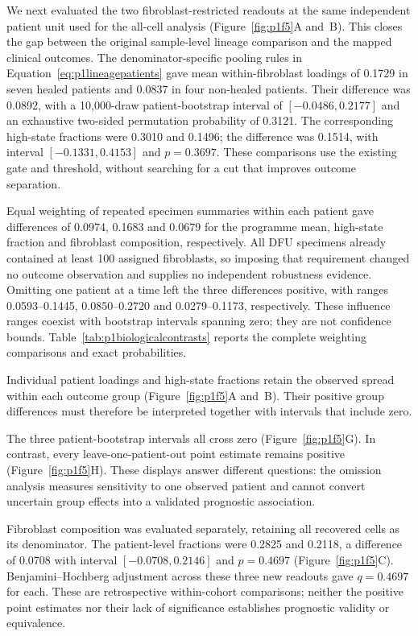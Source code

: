 

We next evaluated the two fibroblast-restricted readouts at the same independent patient unit used for the all-cell analysis (Figure~\ref{fig:p1f5}A and~B). This closes the gap between the original sample-level lineage comparison and the mapped clinical outcomes. The denominator-specific pooling rules in Equation~\eqref{eq:p1lineagepatients} gave mean within-fibroblast loadings of 0.1729 in seven healed patients and 0.0837 in four non-healed patients. Their difference was 0.0892, with a 10,000-draw patient-bootstrap interval of $[-0.0486,0.2177]$ and an exhaustive two-sided permutation probability of 0.3121. The corresponding high-state fractions were 0.3010 and 0.1496; the difference was 0.1514, with interval $[-0.1331,0.4153]$ and $p=0.3697$. These comparisons use the existing gate and threshold, without searching for a cut that improves outcome separation.

Equal weighting of repeated specimen summaries within each patient gave differences of 0.0974, 0.1683 and 0.0679 for the programme mean, high-state fraction and fibroblast composition, respectively. All DFU specimens already contained at least 100 assigned fibroblasts, so imposing that requirement changed no outcome observation and supplies no independent robustness evidence. Omitting one patient at a time left the three differences positive, with ranges 0.0593--0.1445, 0.0850--0.2720 and 0.0279--0.1173, respectively. These influence ranges coexist with bootstrap intervals spanning zero; they are not confidence bounds. Table~\ref{tab:p1biologicalcontrasts} reports the complete weighting comparisons and exact probabilities.

Individual patient loadings and high-state fractions retain the observed spread within each outcome group (Figure~\ref{fig:p1f5}A and~B). Their positive group differences must therefore be interpreted together with intervals that include zero.

The three patient-bootstrap intervals all cross zero (Figure~\ref{fig:p1f5}G). In contrast, every leave-one-patient-out point estimate remains positive (Figure~\ref{fig:p1f5}H). These displays answer different questions: the omission analysis measures sensitivity to one observed patient and cannot convert uncertain group effects into a validated prognostic association.

Fibroblast composition was evaluated separately, retaining all recovered cells as its denominator. The patient-level fractions were 0.2825 and 0.2118, a difference of 0.0708 with interval $[-0.0708,0.2146]$ and $p=0.4697$ (Figure~\ref{fig:p1f5}C). Benjamini--Hochberg adjustment across these three new readouts gave $q=0.4697$ for each. These are retrospective within-cohort comparisons; neither the positive point estimates nor their lack of significance establishes prognostic validity or equivalence.

